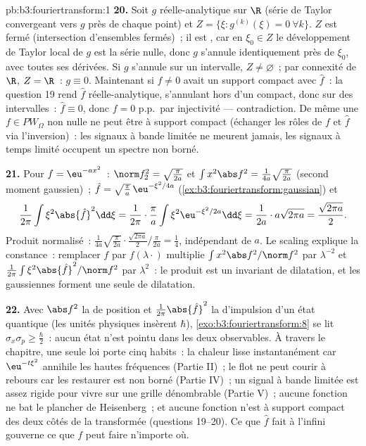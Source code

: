 \begin{solution}{pb:b3:fouriertransform:1}
\textbf{20.} Soit $g$ réelle-analytique sur $\R$ (série de
Taylor convergeant vers $g$ près de chaque point) et $Z =
\{\xi : g^{(k)}(\xi) = 0\ \forall k\}$. $Z$ est fermé
(intersection d'ensembles fermés)~; il est , car en
$\xi_0 \in Z$ le développement de Taylor local de $g$ est la
série nulle, donc $g$ s'annule identiquement près de
$\xi_0$, avec toutes ses dérivées. Si $g$ s'annule sur un
intervalle, $Z \neq \varnothing$~; par connexité de $\R$, $Z
= \R$~: $g \equiv 0$. Maintenant si $f \neq 0$ avait un
support compact avec $\hat f$~: la question 19 rend $\hat f$
réelle-analytique, s'annulant hors d'un compact, donc sur
des intervalles~: $\hat f \equiv 0$, donc $f = 0$ p.p.\ par
injectivité --- contradiction. De même une $f \in PW_\Omega$
non nulle ne peut être à support compact (échanger les rôles
de $f$ et $\hat f$ via l'inversion)~: les signaux à bande
limitée ne meurent jamais, les signaux à temps limité
occupent un spectre non borné.

\textbf{21.} Pour $f = \eu^{-ax^2}$~: $\norm f_2^2 =
\sqrt{\frac\pi{2a}}$ et $\int x^2\abs f^2 =
\frac1{4a}\sqrt{\frac{\pi}{2a}}$ (second moment gaussien)~;
$\hat f = \sqrt{\frac\pi a}\,\eu^{-\xi^2/4a}$
(\cref{ex:b3:fouriertransform:gaussian}) et
\[
\frac1{2\pi}\int\xi^2\abs{\hat f}^2\dd\xi =
\frac1{2\pi}\cdot\frac\pi a\int\xi^2
\eu^{-\xi^2/2a}\dd\xi = \frac1{2a}\cdot a\sqrt{2\pi a}
= \frac{\sqrt{2\pi a}}2 .
\]
Produit normalisé~: $\frac1{4a}\sqrt{\frac\pi{2a}}\cdot
\frac{\sqrt{2\pi a}}2\big/\frac{\pi}{2a} = \frac14$,
indépendant de $a$. Le scaling explique la constance~:
remplacer $f$ par $f(\lambda\cdot)$ multiplie $\int
x^2\abs f^2/\norm f^2$ par $\lambda^{-2}$ et
$\frac1{2\pi}\int\xi^2\abs{\hat f}^2/\norm f^2$ par
$\lambda^{2}$~: le produit est un invariant de dilatation, et
les gaussiennes forment une seule  de dilatation.

\textbf{22.} Avec $\abs f^2$ la  de position et
$\frac1{2\pi}\abs{\hat f}^2$ la  d'impulsion d'un état
quantique (les unités physiques insèrent $\hbar$),
\cref{exo:b3:fouriertransform:8} se lit $\sigma_x\sigma_p
\geq \frac\hbar2$~: aucun état n'est pointu dans les deux
observables. À travers le chapitre, une seule loi porte cinq
habits~: la chaleur lisse instantanément car $\eu^{-t\xi^2}$
annihile les hautes fréquences (Partie II)~; le flot ne peut
courir à rebours car les restaurer est non borné (Partie
IV)~; un signal à bande limitée est assez rigide pour vivre
sur une grille dénombrable (Partie V)~; aucune fonction ne
bat le plancher de Heisenberg~; et aucune fonction n'est à
support compact des deux côtés de la transformée (questions
19--20). Ce que $\hat f$ fait à l'infini gouverne ce que $f$
peut faire n'importe où.


\end{solution}
